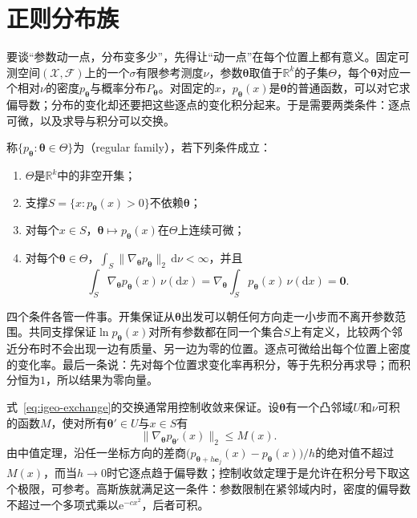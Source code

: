 \section{正则分布族}
\label{sec:igeo-regular}

要谈“参数动一点，分布变多少”，先得让“动一点”在每个位置上都有意义。固定可测空间$(\mathcal{X},\mathcal{F})$上的一个$\sigma$有限参考测度$\nu$，参数$\bm{\theta}$取值于$\mathbb{R}^{k}$的子集$\Theta$，每个$\bm{\theta}$对应一个相对$\nu$的密度$p_{\bm{\theta}}$与概率分布$P_{\bm{\theta}}$。对固定的$x$，$p_{\bm{\theta}}(x)$是$\bm{\theta}$的普通函数，可以对它求偏导数；分布的变化却还要把这些逐点的变化积分起来。于是需要两类条件：逐点可微，以及求导与积分可以交换。

\begin{definition}[正则分布族]
\label{def:igeo-regular-family}
称$\{p_{\bm{\theta}}:\bm{\theta}\in\Theta\}$为（regular family），若下列条件成立：
\begin{enumerate}
  \item $\Theta$是$\mathbb{R}^{k}$中的非空开集；
  \item 支撑$S=\{x:p_{\bm{\theta}}(x)>0\}$不依赖$\bm{\theta}$；
  \item 对每个$x\in S$，$\bm{\theta}\mapsto p_{\bm{\theta}}(x)$在$\Theta$上连续可微；
  \item 对每个$\bm{\theta}\in\Theta$，$\int_{S}\lVert\nabla_{\bm{\theta}}p_{\bm{\theta}}\rVert_2\,\mathrm{d}\nu<\infty$，并且
  \begin{equation}
    \int_{S}\nabla_{\bm{\theta}}p_{\bm{\theta}}(x)\,\nu(\mathrm{d}x)=\nabla_{\bm{\theta}}\int_{S}p_{\bm{\theta}}(x)\,\nu(\mathrm{d}x)=\bm{0}.
    \label{eq:igeo-exchange}
  \end{equation}
\end{enumerate}
\end{definition}

四个条件各管一件事。开集保证从$\bm{\theta}$出发可以朝任何方向走一小步而不离开参数范围。共同支撑保证$\ln p_{\bm{\theta}}(x)$对所有参数都在同一个集合$S$上有定义，比较两个邻近分布时不会出现一边有质量、另一边为零的位置。逐点可微给出每个位置上密度的变化率。最后一条说：先对每个位置求变化率再积分，等于先积分再求导；而积分恒为$1$，所以结果为零向量。

式~\eqref{eq:igeo-exchange}的交换通常用控制收敛来保证。设$\bm{\theta}$有一个凸邻域$U$和$\nu$可积的函数$M$，使对所有$\bm{\theta}'\in U$与$x\in S$有
\[
  \lVert\nabla_{\bm{\theta}}p_{\bm{\theta}'}(x)\rVert_2\leq M(x).
\]
由中值定理，沿任一坐标方向的差商$\bigl(p_{\bm{\theta}+h\bm{e}_j}(x)-p_{\bm{\theta}}(x)\bigr)/h$的绝对值不超过$M(x)$，而当$h\to0$时它逐点趋于偏导数；控制收敛定理于是允许在积分号下取这个极限，可参考。高斯族就满足这一条件：参数限制在紧邻域内时，密度的偏导数不超过一个多项式乘以$\mathrm{e}^{-cx^{2}}$，后者可积。

